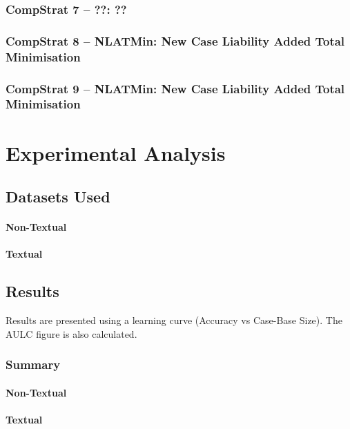 \documentclass[a4paper,11pt]{report}
\begin{document}
\subsection{CompStrat 7 – ??: ??}
\subsection{CompStrat 8 – NLATMin: New Case Liability Added Total Minimisation}
\subsection{CompStrat 9 – NLATMin: New Case Liability Added Total Minimisation}

\chapter{Experimental Analysis\label{cha:expanalysis}}
\section{Datasets Used}
\subsubsection{Non-Textual}

\subsubsection{Textual}

\section{Results}
Results are presented using a learning curve (Accuracy vs Case-Base Size). The AULC figure is also calculated.

\begin{table}
\subsection{Summary}

\subsubsection{Non-Textual}
{\footnotesize {}}

\subsubsection{Textual}
{\footnotesize {}}
\end{table}
\end{document}
